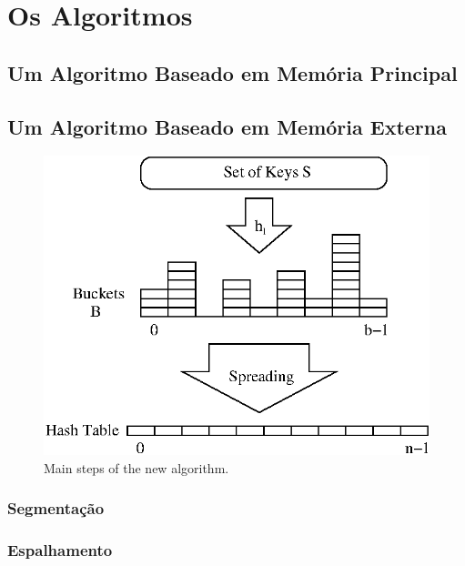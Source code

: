 \section{Os Algoritmos}
\label{sec:thealgorithm}

\subsection{Um Algoritmo Baseado em Mem\'oria Principal}

\subsection{Um Algoritmo Baseado em Mem\'oria Externa}
\begin{figure}
\centering
  \includegraphics{figs/brz.ps}
\caption{Main steps of the new algorithm.}
\label{fig:new-algo-main-steps}
\end{figure}

\subsubsection{Segmenta\c{c}\~ao}
\subsubsection{Espalhamento}
